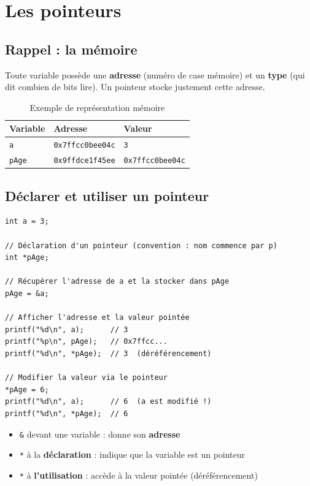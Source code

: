 \documentclass[12pt,a4paper]{article}
\begin{document}
\section{Les pointeurs}

\subsection{Rappel : la mémoire}

Toute variable possède une \textbf{adresse} (numéro de case mémoire) et un \textbf{type} (qui dit combien de bits lire). Un pointeur stocke justement cette adresse.

\begin{table}[h!]
\centering
\caption{Exemple de représentation mémoire}
\begin{tabular}{lll}
\toprule
\textbf{Variable} & \textbf{Adresse} & \textbf{Valeur} \\
\midrule
\texttt{a}    & \texttt{0x7ffcc0bee04c} & \texttt{3} \\
\texttt{pAge} & \texttt{0x9ffdce1f45ee} & \texttt{0x7ffcc0bee04c} \\
\bottomrule
\end{tabular}
\end{table}

\subsection{Déclarer et utiliser un pointeur}

\begin{lstlisting}[caption={Déclaration, & et *}]
int a = 3;

// Déclaration d'un pointeur (convention : nom commence par p)
int *pAge;

// Récupérer l'adresse de a et la stocker dans pAge
pAge = &a;

// Afficher l'adresse et la valeur pointée
printf("%d\n", a);      // 3
printf("%p\n", pAge);   // 0x7ffcc...
printf("%d\n", *pAge);  // 3  (déréférencement)

// Modifier la valeur via le pointeur
*pAge = 6;
printf("%d\n", a);      // 6  (a est modifié !)
printf("%d\n", *pAge);  // 6
\end{lstlisting}

\begin{regle}
\begin{itemize}
    \item \texttt{\&} devant une variable : donne son \textbf{adresse}
    \item \texttt{*} à la \textbf{déclaration} : indique que la variable est un pointeur
    \item \texttt{*} à \textbf{l'utilisation} : accède à la valeur pointée (déréférencement)
\end{itemize}
\end{regle}
\end{document}
